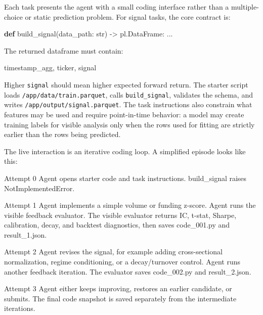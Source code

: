 \documentclass[
]{article}
\newenvironment{Shaded}{}{}
\newcommand{\BuiltInTok}[1]{\textcolor[rgb]{0.00,0.50,0.00}{#1}}
\newcommand{\KeywordTok}[1]{\textcolor[rgb]{0.00,0.44,0.13}{\textbf{#1}}}
\newcommand{\NormalTok}[1]{#1}
\newcommand{\OperatorTok}[1]{\textcolor[rgb]{0.40,0.40,0.40}{#1}}
\begin{document}
Each task presents the agent with a small coding interface rather than a multiple-choice or static prediction problem. For signal tasks, the core contract is:

\begin{Shaded}
\begin{Highlighting}[]
\KeywordTok{def}\NormalTok{ build\_signal(data\_path: }\BuiltInTok{str}\NormalTok{) }\OperatorTok{{-}\textgreater{}}\NormalTok{ pl.DataFrame:}
\NormalTok{    ...}
\end{Highlighting}
\end{Shaded}

The returned dataframe must contain:

\begin{Shaded}
\begin{Highlighting}[]
\NormalTok{timestamp\_agg, ticker, signal}
\end{Highlighting}
\end{Shaded}

Higher \texttt{signal} should mean higher expected forward return. The starter script loads \texttt{/app/data/train.parquet}, calls \texttt{build\_signal}, validates the schema, and writes \texttt{/app/output/signal.parquet}. The task instructions also constrain what features may be used and require point-in-time behavior: a model may create training labels for visible analysis only when the rows used for fitting are strictly earlier than the rows being predicted.

The live interaction is an iterative coding loop. A simplified episode looks like this:

\begin{Shaded}
\begin{Highlighting}[]
\NormalTok{Attempt 0}
\NormalTok{  Agent opens starter code and task instructions.}
\NormalTok{  build\_signal raises NotImplementedError.}

\NormalTok{Attempt 1}
\NormalTok{  Agent implements a simple volume or funding z{-}score.}
\NormalTok{  Agent runs the visible feedback evaluator.}
\NormalTok{  The visible evaluator returns IC, t{-}stat, Sharpe, calibration, decay, and backtest}
\NormalTok{  diagnostics, then saves code\_001.py and result\_1.json.}

\NormalTok{Attempt 2}
\NormalTok{  Agent revises the signal, for example adding cross{-}sectional normalization,}
\NormalTok{  regime conditioning, or a decay/turnover control.}
\NormalTok{  Agent runs another feedback iteration.}
\NormalTok{  The evaluator saves code\_002.py and result\_2.json.}

\NormalTok{Attempt 3}
\NormalTok{  Agent either keeps improving, restores an earlier candidate, or submits.}
\NormalTok{  The final code snapshot is saved separately from the intermediate iterations.}
\end{Highlighting}
\end{Shaded}
\end{document}
